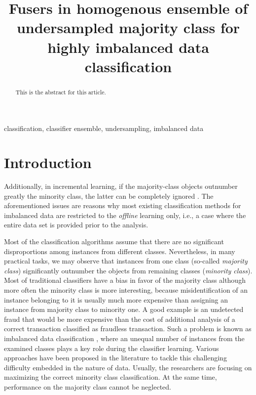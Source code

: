 \documentclass[pmlr]{jmlr}
\title
[Fusers in homogenous ensemble of undersampled majority class]
{
	Fusers in homogenous ensemble of undersampled majority class for highly imbalanced data classification%
}
\begin{document}
\maketitle

\begin{abstract}
This is the abstract for this article.
\end{abstract}
\begin{keywords}
classification, classifier ensemble, undersampling, imbalanced data
\end{keywords}

\section{Introduction}
\label{sec:intro}

Additionally, in incremental learning, if the majority-class objects outnumber greatly the minority class, the latter can be completely ignored \cite{He:2009}. The aforementioned issues are reasons why most existing classification methods for imbalanced data are restricted to the \textit{offline} learning only, i.e., a case where the entire data set is provided prior to the analysis.


Most of the classification algorithms assume that there are no significant disproportions among instances from different classes. Nevertheless, in many practical tasks, we may observe that instances from one class (so-called \textit{majority class}) significantly outnumber the objects from remaining classes (\textit{minority class}). Most of traditional classifiers have a bias in favor of the majority class although more often the minority class is more interesting, because misidentification of an instance belonging to it is usually much more expensive than assigning an instance from majority class to minority one. A good example is an undetected fraud that would be more expensive than the cost of additional analysis of a correct transaction classified as fraudless transaction. Such a problem is known as imbalanced data classification \cite{Sun:2009,Wang:2017}, where an unequal number of instances from the examined classes plays a key role during the classifier learning. Various approaches have been proposed in the literature to tackle this challenging difficulty embedded in the nature of data. Usually, the researchers are focusing on maximizing the correct minority class classification. At the same time, performance on the majority class cannot be neglected.
\end{document}
